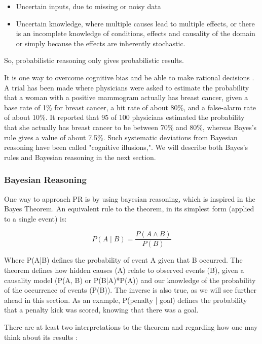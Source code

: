 \begin{itemize}
  \item Uncertain inputs, due to missing or noisy data
  \item Uncertain knowledge, where multiple causes lead to multiple effects,
  or there is an incomplete knowledge of conditions, effects and causality of the
  domain or simply because the effects are inherently stochastic.
\end{itemize}

So, probabilistic reasoning only gives probabilistic results.

It is one way to
overcome cognitive bias and be able to make rational decisions \cite{Sedlmeier2001}.
A trial has been made \cite{christensen1982experience}
where physicians were asked to estimate the probability that a
woman with a positive mammogram actually has breast cancer, given a base rate of
1\% for breast cancer, a hit rate of about 80\%, and a false-alarm rate of about
10\%. It reported that 95 of 100 physicians estimated the probability that she
actually has breast cancer to be between 70\% and 80\%, whereas Bayes's rule
gives a value of about 7.5\%. Such systematic deviations from Bayesian reasoning
have been called "cognitive illusions,". We will describe both Bayes's rules
and Bayesian reasoning in the next section.

\subsubsection{Bayesian Reasoning}

One way to approach PR is by using bayesian reasoning, which is inspired in the
Bayes Theorem. An equivalent rule to the theorem, in its simplest form (applied
to a single event) is:

$$ P(A \mid B) = \frac{P(A \land B)}{P(B)} $$

Where P(A|B) defines the probability of event A given that B occurred.
The theorem defines how hidden causes (A) relate to observed events (B), given
a causality model (P(A, B) or P(B|A)*P(A)) and our knowledge of the probability of the
occurrence of events (P(B)). The inverse is also true, as we will see further
ahead in this section.
As an example, P(penalty | goal) defines the probability that a penalty kick was
scored, knowing that there was a goal.

There are at least two interpretations to the theorem and regarding how one may think
about its results \cite{Fienberg2006}:

